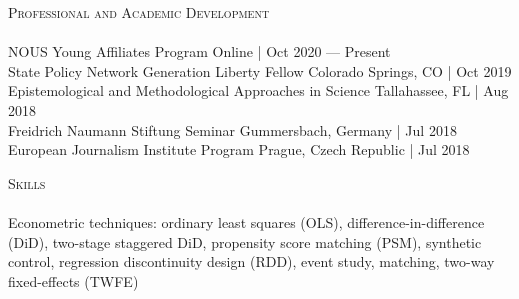 \documentclass[a4paper,11pt]{article}
\newcommand{\lineunder} {
    \vspace*{-8pt} \\
    \hspace*{-18pt} \hrulefill \\
}
\newcommand{\header} [1] {
    {\hspace*{-18pt}\vspace*{6pt} \textsc{\large{#1}}}
    \vspace*{-6pt} \lineunder
}
\begin{document}
\header{Professional and Academic Development} 
\vspace{1mm}
NOUS Young Affiliates Program \hfill Online | Oct 2020 --- Present \\
\vspace{1mm}
State Policy Network Generation Liberty Fellow \hfill Colorado Springs, CO | Oct 2019 \\
\vspace{1mm}
Epistemological and Methodological Approaches in Science \hfill Tallahassee, FL | Aug 2018\\
\vspace{1mm}
Freidrich Naumann Stiftung Seminar \hfill Gummersbach, Germany | Jul 2018\\
\vspace{1mm}
European Journalism Institute Program \hfill Prague, Czech Republic | Jul 2018
\vspace{2mm}

\header{Skills}
%
\vspace{1mm}
Econometric techniques: ordinary least squares (OLS), difference-in-difference (DiD), two-stage staggered DiD, propensity score matching (PSM), synthetic control, regression discontinuity design (RDD), event study, matching, two-way fixed-effects (TWFE)
\end{document}
